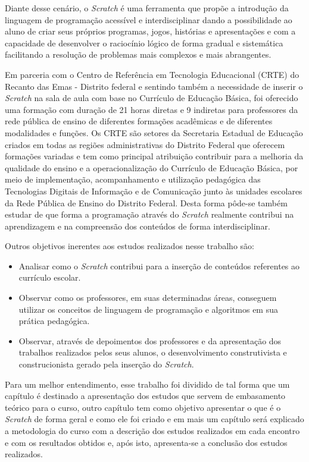 \documentclass[12pt, openright, a4paper, brazil, english, french, spanish, bibjustif, openany, oneside]{abntex2}
\begin{document}
Diante desse cenário, o \textit{Scratch} é uma ferramenta que propõe a introdução da linguagem de programação acessível e interdisciplinar dando a possibilidade ao aluno de criar seus próprios programas, jogos, histórias e apresentações e com a capacidade de desenvolver o raciocínio lógico de forma gradual e sistemática facilitando a resolução de problemas mais complexos e mais abrangentes.

Em parceria com o Centro de Referência em Tecnologia Educacional (CRTE) do Recanto das Emas - Distrito federal e sentindo também a necessidade de inserir o \textit{Scratch} na sala de aula com base no Currículo de Educação Básica, foi oferecido uma formação com duração de 21 horas diretas e 9 indiretas para professores da rede pública de ensino de diferentes formações acadêmicas e de diferentes modalidades e funções. Os CRTE são setores da Secretaria Estadual de Educação criados em todas as regiões administrativas do Distrito Federal que oferecem formações variadas e tem como principal atribuição contribuir para a melhoria da qualidade  do ensino e a operacionalização do Currículo de Educação Básica, por meio de implementação, acompanhamento e utilização pedagógica das Tecnologias Digitais de Informação e de Comunicação junto às unidades escolares da Rede Pública de Ensino do Distrito Federal. Desta forma pôde-se também estudar de que forma a programação através do \textit{Scratch} realmente contribui na aprendizagem e na compreensão dos conteúdos de forma interdisciplinar.

Outros objetivos inerentes aos estudos realizados nesse trabalho são:
\begin{itemize}


\item Analisar como o \textit{Scratch} contribui para a inserção de conteúdos referentes ao currículo escolar.
\item Observar como os professores, em suas determinadas áreas, conseguem utilizar os conceitos de linguagem de programação e algoritmos em sua prática pedagógica.
\item Observar, através de depoimentos dos professores e da apresentação dos trabalhos realizados pelos seus alunos, o desenvolvimento construtivista e construcionista gerado pela inserção do \textit{Scratch}.

\end{itemize}

Para um melhor entendimento, esse trabalho foi dividido de tal forma que um capítulo é destinado a apresentação dos estudos que servem de embasamento teórico para o curso, outro capítulo tem como objetivo apresentar o que é o \textit{Scratch} de forma geral e como ele foi criado e em mais um capítulo será explicado a metodologia do curso com a descrição dos estudos realizados em cada encontro e com os resultados obtidos e, após isto, apresenta-se a conclusão dos estudos realizados.
\end{document}
